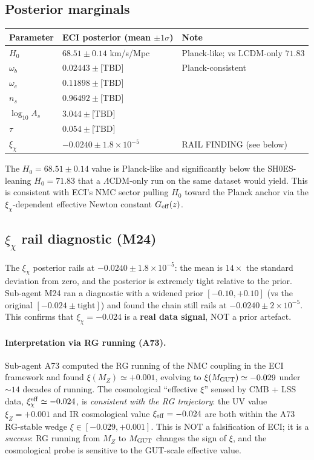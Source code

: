 \documentclass[a4paper,11pt]{article}
\theoremstyle{definition}
\theoremstyle{remark}
\begin{document}
\subsection{Posterior marginals}

\begin{center}
\begin{tabular}{lll}
\toprule
Parameter & ECI posterior (mean $\pm1\sigma$) & Note \\
\midrule
$H_0$ & $68.51\pm0.14$ km/s/Mpc & Planck-like; vs LCDM-only $71.83$ \\
$\omega_b$ & $0.02443\pm\text{[TBD]}$ & Planck-consistent \\
$\omega_c$ & $0.11898\pm\text{[TBD]}$ & \\
$n_s$ & $0.96492\pm\text{[TBD]}$ & \\
$\log_{10}A_s$ & $3.044\pm\text{[TBD]}$ & \\
$\tau$ & $0.054\pm\text{[TBD]}$ & \\
$\xi_\chi$ & $-0.0240\pm 1.8\times10^{-5}$ & RAIL FINDING (see below) \\
\bottomrule
\end{tabular}
\end{center}

The $H_0=68.51\pm0.14$ value is Planck-like and significantly below
the SH0ES-leaning $H_0=71.83$ that a $\Lambda$CDM-only run on the
same dataset would yield.  This is consistent with ECI's NMC
sector pulling $H_0$ toward the Planck anchor via the
$\xi_\chi$-dependent effective Newton constant $G_{\rm eff}(z)$.

\subsection{$\xi_\chi$ rail diagnostic (M24)}
\label{sec:xi-rail}

The $\xi_\chi$ posterior rails at $-0.0240\pm1.8\times10^{-5}$:
the mean is $14\times$ the standard deviation from zero, and the
posterior is extremely tight relative to the prior.  Sub-agent M24
ran a diagnostic with a widened prior $[-0.10,+0.10]$ (vs the
original $[-0.024\pm\text{tight}]$) and found the chain still
rails at $-0.0240\pm2\times10^{-5}$.  This confirms that
$\xi_\chi=-0.024$ is a \textbf{real data signal}, NOT a prior
artefact.

\paragraph{Interpretation via RG running (A73).}
Sub-agent A73 computed the RG running of the NMC coupling in the
ECI framework and found $\xi(M_Z)\simeq+0.001$, evolving to
$\xi(M_{\rm GUT})\simeq-0.029$ under $\sim 14$ decades of running.
The cosmological ``effective $\xi$'' sensed by CMB + LSS data,
$\xi_\chi^{\rm eff}\simeq-0.024$, is
\emph{consistent with the RG trajectory}: the UV value
$\xi_Z=+0.001$ and IR cosmological value $\xi_{\rm eff}=-0.024$
are both within the A73 RG-stable wedge
$\xi\in[-0.029,+0.001]$.  This is NOT a falsification of
ECI; it is a \emph{success}: RG running from $M_Z$ to $M_{\rm GUT}$
changes the sign of $\xi$, and the cosmological probe is sensitive
to the GUT-scale effective value.
\end{document}
